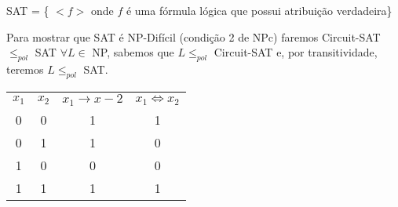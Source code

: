 \documentclass[a4paper,oneside,article,table]{article}
\begin{document}
            SAT = \{ $<f>$ onde $f$ é uma fórmula lógica que possui atribuição verdadeira\}

            Para mostrar que SAT é NP-Difícil (condição 2 de NPc) faremos Circuit-SAT ${\leq}_{pol}$ SAT
            $\forall L \in$ NP, sabemos que $L {\leq}_{pol}$ Circuit-SAT e, por transitividade, teremos $L {\leq}_{pol}$ SAT.

            \begin{table}
                \begin{tabular}{c c c c}
                        $x_1$ & $x_2$ & $x_1 \rightarrow x-2$ & $x_1 \iff x_2$\\
                        0 & 0 & 1 & 1\\
                        0 & 1 & 1 & 0\\
                        1 & 0 & 0 & 0\\
                        1 & 1 & 1 & 1\\
                \end{tabular}
            \end{table}
\end{document}
